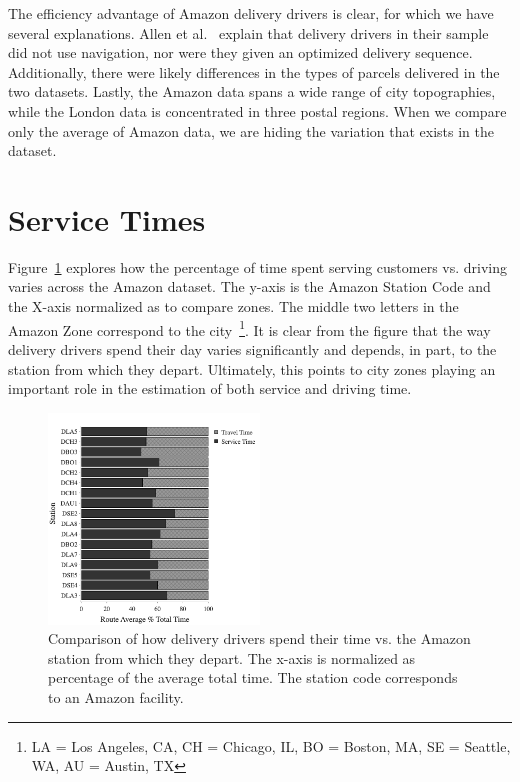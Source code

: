 \documentclass[12pt]{article}
\theoremstyle{plain}
\numberwithin{equation}{section}
\newcommand{\etal}{et al.}
\begin{document}
The efficiency advantage of Amazon delivery drivers is clear, for which we have several explanations. Allen \etal~\cite{london_ftc2050} explain that delivery drivers in their sample did not use navigation, nor were they given an optimized delivery sequence. Additionally, there were likely differences in the types of parcels delivered in the two datasets. Lastly, the Amazon data spans a wide range of city topographies, while the London data is concentrated in three postal regions. When we compare only the average of Amazon data, we are hiding the variation that exists in the dataset.

\section{Service Times}

Figure~\ref{fig:station_vs_parked_driving} explores how the percentage of time spent serving customers vs. driving varies across the Amazon dataset. The y-axis is the Amazon Station Code and the X-axis normalized as to compare zones. The middle two letters in the Amazon Zone correspond to the city~\footnote{LA = Los Angeles, CA, CH = Chicago, IL, BO = Boston, MA, SE = Seattle, WA, AU = Austin, TX}. It is clear from the figure that the way delivery drivers spend their day varies significantly and depends, in part, to the station from which they depart. Ultimately, this points to city zones playing an important role in the estimation of both service and driving time.

\begin{figure}[h!]
\centering
\includegraphics[width=0.5\textwidth]{Images/station_vs_parked_driving.png}
\caption{Comparison of how delivery drivers spend their time vs. the Amazon station from which they depart. The x-axis is normalized as percentage of the average total time. The station code corresponds to an Amazon facility.}
\label{fig:station_vs_parked_driving}
\end{figure}
\end{document}
